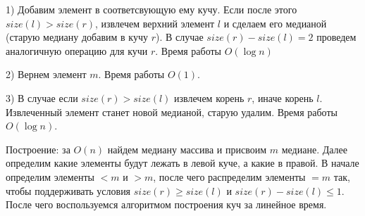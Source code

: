 \documentclass{article}
\begin{document}
\begin{flushleft}
1) Добавим элемент в соответсвующую ему кучу. Если после этого $size(l) > size(r)$, извлечем верхний элемент $l$ и сделаем его медианой (старую медиану добавим в кучу $r$).  В случае $size(r) - size(l) = 2$ проведем аналогичную операцию для кучи $r$. Время работы $O(\log{n})$

2) Вернем элемент $m$. Время работы $O(1)$.

3) В случае если $size(r) > size(l)$ извлечем корень $r$, иначе корень $l$. Извлеченный элемент станет новой медианой, старую удалим. Время работы $O(\log{n})$.

Построение: за $O(n)$ найдем медиану массива и присвоим $m$ медиане. Далее определим какие элементы будут лежать в левой куче, а какие в правой. В начале определим элементы $< m$ и $> m$, после чего распределим элементы $= m$ так, чтобы поддерживать условия $size(r) \ge size(l)$ и $size(r) - size(l) \le 1$. После чего воспользуемся алгоритмом построения куч за линейное время.

\section{}



\end{flushleft}
\end{document}
